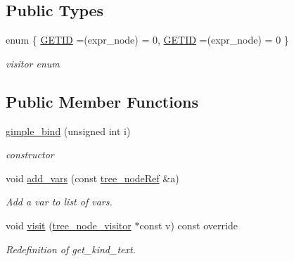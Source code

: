 \subsection*{Public Types}
\begin{DoxyCompactItemize}
\item 
enum \{ \hyperlink{structgimple__bind_a25674d4023cf24f1df44d722285a161aa33ff0e386da6380d52ef6aa200d43de1}{G\+E\+T\+ID} =(expr\+\_\+node) = 0, 
\hyperlink{structgimple__bind_a25674d4023cf24f1df44d722285a161aa33ff0e386da6380d52ef6aa200d43de1}{G\+E\+T\+ID} =(expr\+\_\+node) = 0
 \}\begin{DoxyCompactList}\small\item\em visitor enum \end{DoxyCompactList}
\end{DoxyCompactItemize}
\subsection*{Public Member Functions}
\begin{DoxyCompactItemize}
\item 
\hyperlink{structgimple__bind_a9d2ff8f163b9f89de2ce3f23991a507e}{gimple\+\_\+bind} (unsigned int i)
\begin{DoxyCompactList}\small\item\em constructor \end{DoxyCompactList}\item 
void \hyperlink{structgimple__bind_a0b27ac73453ea10ebb7fcefa5fd058d9}{add\+\_\+vars} (const \hyperlink{tree__node_8hpp_a6ee377554d1c4871ad66a337eaa67fd5}{tree\+\_\+node\+Ref} \&a)
\begin{DoxyCompactList}\small\item\em Add a var to list of vars. \end{DoxyCompactList}\item 
void \hyperlink{structgimple__bind_a63a576886251512f6238e7055819869f}{visit} (\hyperlink{classtree__node__visitor}{tree\+\_\+node\+\_\+visitor} $\ast$const v) const override
\begin{DoxyCompactList}\small\item\em Redefinition of get\+\_\+kind\+\_\+text. \end{DoxyCompactList}\end{DoxyCompactItemize}
